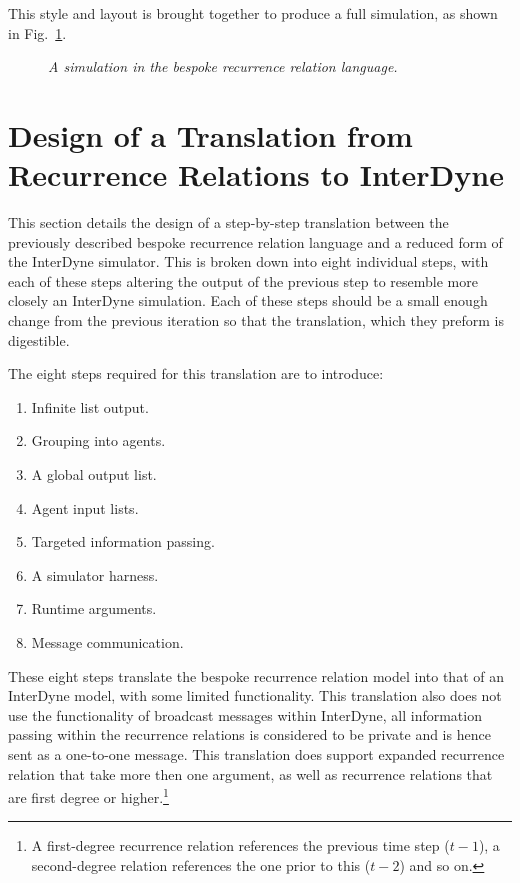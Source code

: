 \documentclass{article}
\begin{document}
This style and layout is brought together to produce a full simulation, as shown in Fig.~\ref{fig:8exofla}.
\begin{figure}[H]
	\centering
	
	\caption{\it A simulation in the bespoke recurrence relation language.}
	\label{fig:8exofla}
\end{figure} 






\newpage
\section{Design of a Translation from Recurrence Relations to InterDyne} 
This section details the design of a step-by-step translation between the previously described bespoke recurrence relation language and a reduced form of the InterDyne simulator. This is broken down into eight individual steps, with each of these steps altering the output of the previous step to resemble more closely an InterDyne simulation. Each of these steps should be a small enough change from the previous iteration so that the translation, which they preform is digestible. 

The eight steps required for this translation are to introduce:
\begin{enumerate}
  \item Infinite list output.
  \item Grouping into agents.
  \item A global output list.
  \item Agent input lists.
  \item Targeted information passing.
  \item A simulator harness.
  \item Runtime arguments.
  \item Message communication.
\end{enumerate} 
These eight steps translate the bespoke recurrence relation model into that of an InterDyne model, with some limited functionality. This translation also does not use the functionality of broadcast messages within InterDyne, all information passing within the recurrence relations is considered to be private and is hence sent as a one-to-one message. This translation does support expanded recurrence relation that take more then one argument, as well as recurrence relations that are first degree or higher.\footnote{A first-degree recurrence relation references the previous time step ($t-1$), a second-degree relation references the one prior to this ($t-2$) and so on.}  
\end{document}
